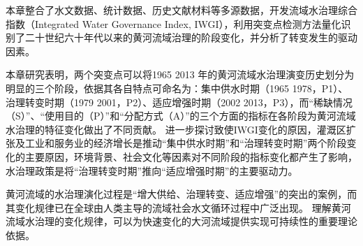 本章整合了水文数据、统计数据、历史文献材料等多源数据，开发流域水治理综合指数（Integrated Water Governance Index, IWGI），利用突变点检测方法量化识别了二十世纪六十年代以来的黄河流域治理的阶段变化，并分析了转变发生的驱动因素。

本章研究表明，两个突变点可以将1965 \textendash{} 2013 年的黄河流域水治理演变历史划分为明显的三个阶段，依据其各自特点可命名为：集中供水时期（1965 \textendash{} 1978，P1）、治理转变时期（1979 \textendash{} 2001，P2）、适应增强时期（2002 \textendash{} 2013，P3），而“稀缺情况（S）”、“使用目的（P）”和“分配方式（A）”的三个方面的指标在各阶段为黄河流域水治理的特征变化做出了不同贡献。
进一步探讨致使IWGI变化的原因，灌溉区扩张及工业和服务业的经济增长是推动“集中供水时期”和“治理转变时期”两个阶段变化的主要原因，环境背景、社会文化等因素对不同阶段的指标变化都产生了影响，水治理政策是将“治理转变时期”推向“适应增强时期”的主要驱动力。

黄河流域的水治理演化过程是“增大供给、治理转变、适应增强”的突出的案例，而其变化规律已在全球由人类主导的流域社会\textendash{}水文循环过程中广泛出现。
理解黄河流域水治理的变化规律，可以为快速变化的大河流域提供实现可持续性的重要理论依据。
